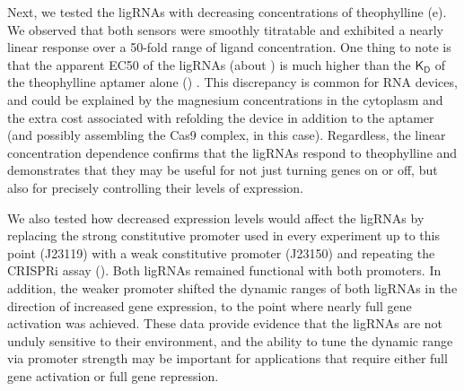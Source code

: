 \documentclass[10pt,oneside]{article}
\begin{document}
Next, we tested the ligRNAs with decreasing concentrations of theophylline (e).  We observed that both sensors were smoothly titratable and exhibited a nearly linear response over a 50-fold range of ligand concentration.  One thing to note is that the apparent EC50 of the ligRNAs (about ) is much higher than the $\mathsf{K_D}$ of the theophylline aptamer alone () \autocite{jenison1994}.  This discrepancy is common for RNA devices, and could be explained by the magnesium concentrations in the cytoplasm \autocite{carothers2010} and the extra cost associated with refolding the device in addition to the aptamer (and possibly assembling the Cas9 complex, in this case).  Regardless, the linear concentration dependence confirms that the ligRNAs respond to theophylline and demonstrates that they may be useful for not just turning genes on or off, but also for precisely controlling their levels of expression.
% 
% 
% 
% 
% 
% 


We also tested how decreased expression levels would affect the ligRNAs by replacing the strong constitutive promoter used in every experiment up to this point (J23119) with a weak constitutive promoter (J23150) and repeating the CRISPRi assay ().  Both ligRNAs remained functional with both promoters.  In addition, the weaker promoter shifted the dynamic ranges of both ligRNAs in the direction of increased gene expression, to the point where nearly full gene activation was achieved.  These data provide evidence that the ligRNAs are not unduly sensitive to their environment, and the ability to tune the dynamic range via promoter strength may be important for applications that require either full gene activation or full gene repression.


\end{document}
